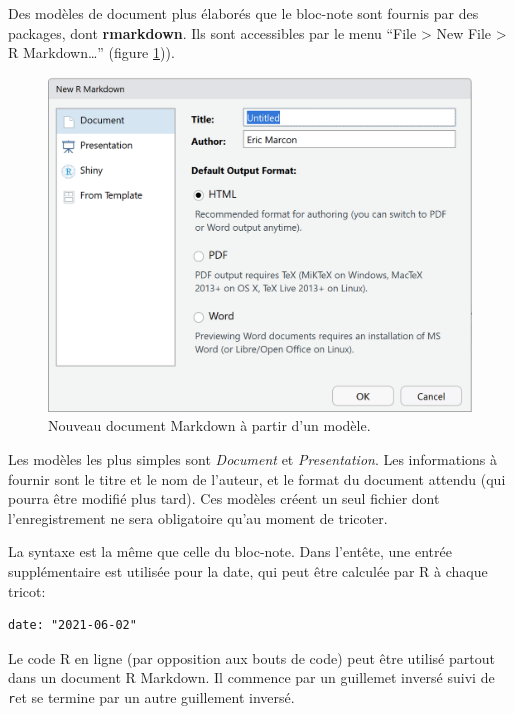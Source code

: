 \documentclass[
  12pt,
  french,
  a4paper,
  extrafontsizes,onecolumn,openright
  ]{memoir}
\begin{document}
Des modèles de document plus élaborés que le bloc-note sont fournis par des packages, dont \textbf{rmarkdown}.
Ils sont accessibles par le menu \enquote{File \textgreater{} New File \textgreater{} R Markdown\ldots{}} (figure \ref{fig:e-rmd1})).



\scriptsize

\begin{figure}

{\centering \includegraphics[width=0.8\linewidth]{images/e-rmd1} 

}

\caption{Nouveau document Markdown à partir d'un modèle.}\label{fig:e-rmd1}
\end{figure}

\normalsize

Les modèles les plus simples sont \emph{Document} et \emph{Presentation}.
Les informations à fournir sont le titre et le nom de l'auteur, et le format du document attendu (qui pourra être modifié plus tard).
Ces modèles créent un seul fichier dont l'enregistrement ne sera obligatoire qu'au moment de tricoter.

La syntaxe est la même que celle du bloc-note.
Dans l'entête, une entrée supplémentaire est utilisée pour la date, qui peut être calculée par R à chaque tricot:

\begin{verbatim}
date: "2021-06-02"
\end{verbatim}

Le code R en ligne (par opposition aux bouts de code) peut être utilisé partout dans un document R Markdown.
Il commence par un guillemet inversé suivi de \texttt{r}et se termine par un autre guillement inversé.
\end{document}
